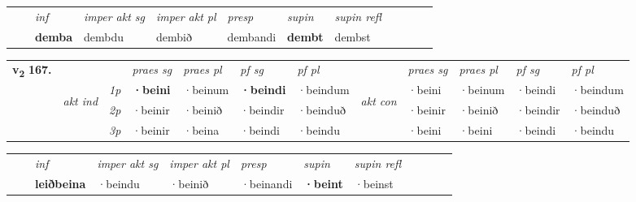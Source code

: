\begin{tabular}{llllllllllll}
 & & \textit{inf} & \textit{imper akt sg} & \textit{imper akt pl}   & \textit{presp} & \textit{supin} & \textit{supin refl}      \\*
  & & \textbf{demba} & dembdu  & dembið   & dembandi &  \textbf{dembt} & dembst  \\*
\cmidrule{1-12}
\end{tabular}



\begin{tabular}{llllllllllll} \toprule
\multirow{4}{*}{{{\textbf{v{\textsubscript{2}}} \Large{\textbf{167.}}}}}  & &   &  \textit{praes sg}  & \textit{praes pl}  &\textit{ pf sg} & \textit{pf pl} &  &  \textit{praes sg}  & \textit{praes pl}  & \textit{pf sg} & \textit{pf pl } \\*
	\cmidrule{4-7} \cmidrule{9-12}
 & \multirow{3}{*}{\begin{turn}{90}\textit{akt ind}\end{turn}} & {\textit{1p}} & \textbf{·beini} & ·beinum    & \textbf{·beindi} & ·beindum & \multirow{3}{*}{\begin{turn}{90}\textit{akt con}\end{turn}} &·beini & ·beinum & ·beindi & ·beindum\\*
& &  {\textit{2p}} &  ·beinir  & ·beinið   & ·beindir & ·beinduð & & ·beinir & ·beinið & ·beindir & ·beinduð \\*
& &  {\textit{3p}} & ·beinir & ·beina   & ·beindi & ·beindu & & ·beini & ·beini& ·beindi & ·beindu  \\*
\cmidrule{4-7} \cmidrule{9-12}
\end{tabular}


\begin{tabular}{llllllllllll}
 & & \textit{inf} & \textit{imper akt sg} & \textit{imper akt pl}   & \textit{presp} & \textit{supin} & \textit{supin refl}      \\*
  & & \textbf{leiðbeina} & ·beindu  & ·beinið   & ·beinandi &  \textbf{·beint} & ·beinst  \\*
\cmidrule{1-12}
\end{tabular}



